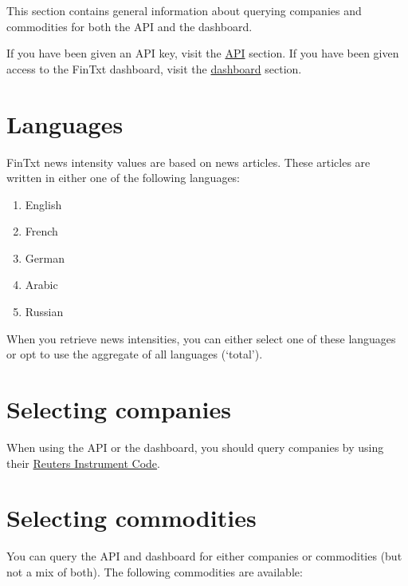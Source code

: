 \documentclass[]{book}
\providecommand{\tightlist}{%
  \setlength{\itemsep}{0pt}\setlength{\parskip}{0pt}}
\theoremstyle{definition}
\theoremstyle{definition}
\theoremstyle{definition}
\theoremstyle{remark}
\begin{document}
This section contains general information about querying companies and
commodities for both the API and the dashboard.

If you have been given an API key, visit the
\href{https://fintxt.github.io/documentation/theapi.html}{API} section.
If you have been given access to the FinTxt dashboard, visit the
\href{https://fintxt.github.io/documentation/thedashboard.html}{dashboard}
section.

\section{Languages}\label{languages}

FinTxt news intensity values are based on news articles. These articles
are written in either one of the following languages:

\begin{enumerate}
\def\labelenumi{\arabic{enumi}.}
\tightlist
\item
  English
\item
  French
\item
  German
\item
  Arabic
\item
  Russian
\end{enumerate}

When you retrieve news intensities, you can either select one of these
languages or opt to use the aggregate of all languages (`total').

\section{Selecting companies}\label{selecting-companies}

When using the API or the dashboard, you should query companies by using
their
\href{https://en.wikipedia.org/wiki/Reuters_Instrument_Code}{Reuters
Instrument Code}.

\section{Selecting commodities}\label{selecting-commodities}

You can query the API and dashboard for either companies or commodities
(but not a mix of both). The following commodities are available:
\end{document}
